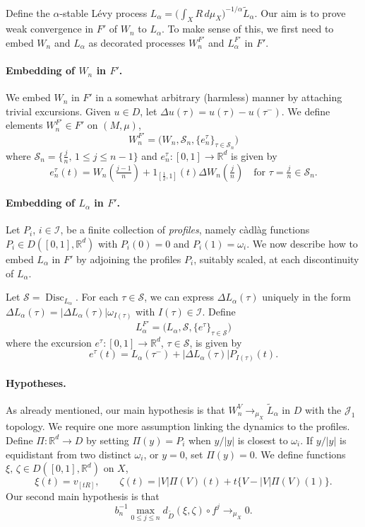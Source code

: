 \documentclass[12pt]{article}
\numberwithin{equation}{section}
\newcommand{\R}{{\mathbb R}}
\newcommand{\cI}{{\mathcal I}}
\newcommand{\cJ}{{\mathcal J}}
\newcommand{\cS}{{\mathcal S}}
\newcommand{\tD}{{\widetilde D}}
\newcommand{\tL}{{\tilde L}}
\newcommand{\disc}{\operatorname{Disc}}
\begin{document}
	Define the $\alpha$-stable L\'evy process $L_\alpha=\big(\int_X R\,d\mu_X\big)^{-1/\alpha} \tL_\alpha$. Our aim is to prove weak convergence in $F'$ of $W_n$ to $L_\alpha$.  To make sense of this, we first need to embed $W_n$ and $L_\alpha$ as decorated processes $W_n^{F'}$ and $L_\alpha^{F'}$ in $F'$.

	\paragraph{Embedding of $W_n$ in $F'$.}
	We embed $W_n$ in $F'$ in a somewhat arbitrary (harmless) manner by attaching trivial excursions.
	Given $u\in D$, let $\Delta u(\tau)=u(\tau)-u(\tau^-)$.
	We define elements $W_n^{F'}\in F'$ on $(M,\mu)$,
	\[
	W_n^{F'}=\big(W_n,\cS_n,\{e_n^\tau\}_{\tau\in\cS_n}\big)
	\]
	where $\cS_n=\{\frac{j}{n},\,1\le j\le n-1\}$ 
	and $e_n^\tau:[0,1]\to\R^d$ is given by
	\[
	e_n^\tau(t)=W_n(\tfrac{j-1}{n})+1_{[\frac12,1]}(t)\Delta W_n(\tfrac{j}{n})
	\quad\text{for $\tau=\tfrac{j}{n}\in\cS_n$.}
	\]

	\paragraph{Embedding of $L_\alpha$ in $F'$.}

	Let $P_i$, $i\in\cI$, be a finite collection of 
	\emph{profiles}, namely c\`adl\`ag functions $P_i\in D([0,1],\R^d)$ 
	with $P_i(0)=0$ and $P_i(1)=\omega_i$.
	We now describe how to embed $L_\alpha$ in $F'$
	by adjoining the profiles $P_i$, suitably scaled, at each discontinuity of $L_\alpha$.

	Let $\cS=\disc_{L_\alpha}$.
	For each $\tau\in\cS$, we can express $\Delta L_\alpha(\tau)$ uniquely in the form
	$\Delta L_\alpha(\tau)=|\Delta L_\alpha(\tau)| \omega_{I(\tau)}$ with $I(\tau)\in\cI$.
	Define
	\[
	L_\alpha^{F'}=\big(L_\alpha,\cS,\{e^\tau\}_{\tau\in\cS}\big)
	\]
	where the excursion
	$e^\tau:[0,1]\to\R^d$, $\tau\in\cS$, is given by
	\[
	e^\tau(t)=L_\alpha(\tau^-)+|\Delta L_\alpha(\tau)|P_{I(\tau)}(t).
	\]

	\paragraph{Hypotheses.}

	As already mentioned, our main hypothesis is that $W_n^V\to_{\mu_X}\tL_\alpha$ in $D$ with the $\cJ_1$ topology.
	We require one more assumption linking the dynamics to the profiles.
Define $\Pi:\R^d\to D$ by setting
$\Pi(y)=P_i$ when $y/|y|$ is closest to $\omega_i$.
If $y/|y|$ is equidistant from two distinct $\omega_i$, or $y=0$, set $\Pi(y)=0$.
	We define functions $\xi,\,\zeta\in D([0,1],\R^d)$ on $X$,
	\[
	\xi(t)=v_{[tR]},\qquad
	\zeta(t)= |V|\Pi(V)(t)+t\big\{V-|V|\Pi(V)(1)\big\}.
	\]
	Our second main hypothesis is that
	\begin{equation} \label{eq:main}
	b_n^{-1}\max_{0\le j\le n} d_\tD(\xi,\zeta)\circ f^j \to_{\mu_X} 0.
	\end{equation} 
\end{document}
